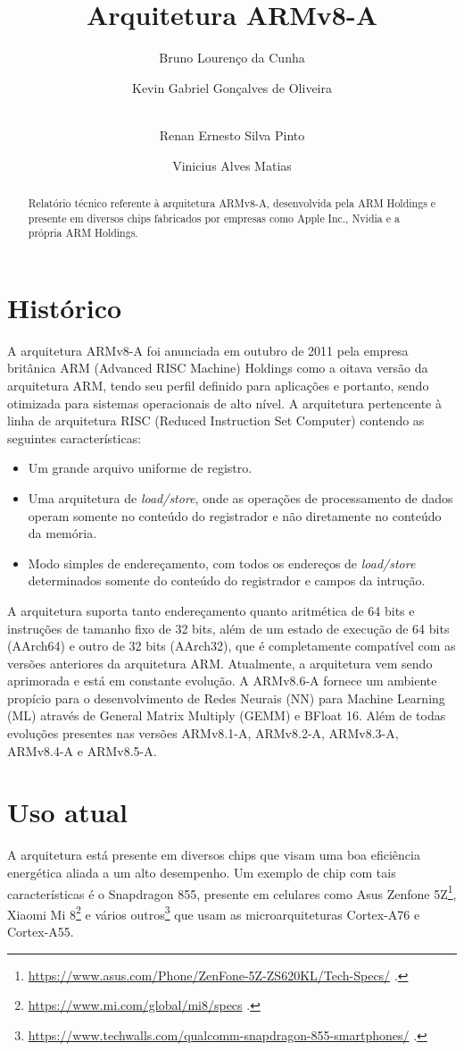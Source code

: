\documentclass[12pt,a4paper,utf8]{ppgsi}
\title{Arquitetura ARMv8-A}
\author{Bruno Lourenço da Cunha\inst{1}
    \and Kevin Gabriel Gonçalves de Oliveira\inst{2}
    \and \\Renan Ernesto Silva Pinto\inst{3}
    \and Vinicius Alves Matias\inst{4}}
\begin{document}
\maketitle

\begin{abstract} 
    Relatório técnico referente à arquitetura ARMv8-A, desenvolvida pela ARM Holdings e presente em diversos chips fabricados por empresas como Apple Inc., Nvidia e a própria ARM Holdings.
\end{abstract}

\section{Histórico}
    A arquitetura ARMv8-A foi anunciada em outubro de 2011 pela empresa britânica ARM (Advanced RISC Machine) Holdings como a oitava versão da arquitetura ARM, tendo seu perfil definido para aplicações e portanto, sendo otimizada para sistemas operacionais de alto nível. 
    A arquitetura pertencente à linha de arquitetura RISC (Reduced Instruction Set Computer) contendo as seguintes características:
    \begin{itemize}
      \item Um grande arquivo uniforme de registro.
      \item Uma arquitetura de \textit{load/store}, onde as operações de processamento de dados operam somente no conteúdo do registrador e não diretamente no conteúdo da memória.
      \item Modo simples de endereçamento, com todos os endereços de \textit{load/store} determinados somente do conteúdo do registrador e campos da intrução.
    \end{itemize}
    A arquitetura suporta tanto endereçamento quanto aritmética de 64 bits e instruções de tamanho fixo de 32 bits, além de um estado de execução de 64 bits (AArch64) e outro de 32 bits (AArch32), que é completamente compatível com as versões anteriores da arquitetura ARM.
    Atualmente, a arquitetura vem sendo aprimorada e está em constante evolução. A ARMv8.6-A fornece um ambiente propício para o desenvolvimento de Redes Neurais (NN) para Machine Learning (ML) através de General Matrix Multiply (GEMM) e BFloat 16. Além de todas evoluções presentes nas versões ARMv8.1-A, ARMv8.2-A, ARMv8.3-A, ARMv8.4-A e ARMv8.5-A.
    
   
 \section{Uso atual}
 A arquitetura está presente em diversos chips que visam uma boa eficiência energética aliada a um alto desempenho. Um exemplo de chip com tais características é o Snapdragon 855, presente em celulares como Asus Zenfone 5Z\footnote{\url{https://www.asus.com/Phone/ZenFone-5Z-ZS620KL/Tech-Specs/} .}, Xiaomi Mi 8\footnote{\url{https://www.mi.com/global/mi8/specs} .} e vários outros\footnote{\url{https://www.techwalls.com/qualcomm-snapdragon-855-smartphones/} .} que usam as microarquiteturas Cortex-A76 e Cortex-A55.
 
\end{document}
